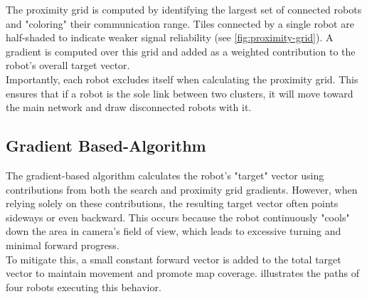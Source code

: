 The proximity grid is computed by identifying the largest set of connected robots and "coloring" their communication range. Tiles connected by a single robot are half-shaded to indicate weaker signal reliability (see \cref{fig:proximity-grid}). A gradient is computed over this grid and added as a weighted contribution to the robot’s overall target vector. \\

Importantly, each robot excludes itself when calculating the proximity grid. This ensures that if a robot is the sole link between two clusters, it will move toward the main network and draw disconnected robots with it.

\subsection{Gradient Based-Algorithm}
The gradient-based algorithm calculates the robot's "target" vector using contributions from both the search and proximity grid gradients. However, when relying solely on these contributions, the resulting target vector often points sideways or even backward. This occurs because the robot continuously "cools" down the area in camera's field of view, which leads to excessive turning and minimal forward progress. \\

To mitigate this, a small constant forward vector is added to the total target vector to maintain movement and promote map coverage.  illustrates the paths of four robots executing this behavior.

